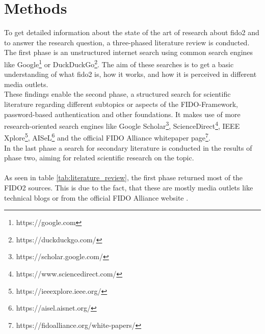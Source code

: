 
\section{Methods}
\label{sec:methods}


To get detailed information about the state of the art of research about \ac{fido2} and to answer the research question, a three-phased literature review is conducted.\\
The first phase is an unstructured internet search using common search engines like Google\footnote{https://google.com} or DuckDuckGo\footnote{https://duckduckgo.com/}. The aim of these searches is to get a basic understanding of what \ac{fido2} is, how it works, and how it is perceived in different media outlets.\\
These findings enable the second phase, a structured search for scientific literature regarding different subtopics or aspects of the FIDO-Framework, password-based authentication and other foundations. It makes use of more research-oriented search engines like Google Scholar\footnote{https://scholar.google.com/}, ScienceDirect\footnote{https://www.sciencedirect.com/}, IEEE Xplore\footnote{https://ieeexplore.ieee.org/}, AISeL\footnote{https://aisel.aisnet.org/} and the official FIDO Alliance whitepaper page\footnote{https://fidoalliance.org/white-papers/}.\\
In the last phase a search for secondary literature is conducted in the results of phase two, aiming for related scientific research on the topic.\\
\\
As seen in table \ref{tab:literature_review}, the first phase returned most of the FIDO2 sources. This is due to the fact, that these are mostly media outlets like technical blogs \citep{hunt2018b,leitner2019, chonng2018, ng2019, mingis2020} or from the official FIDO Alliance website \citep{fido2_overview,fido2_webauthn}.

